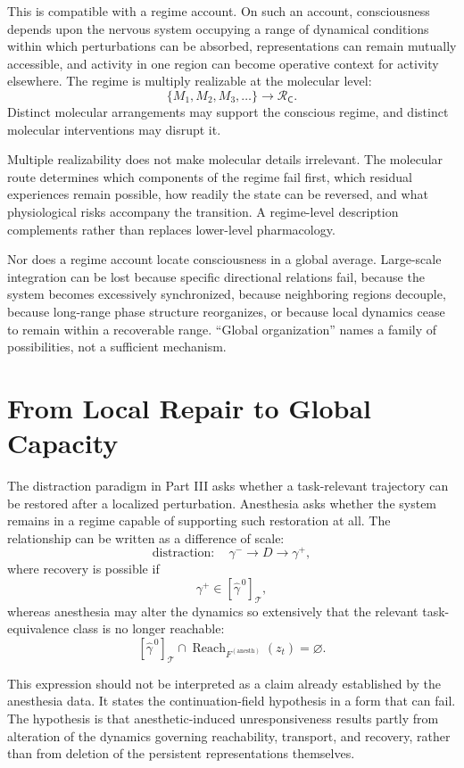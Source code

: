 \documentclass[11pt]{book}
\begin{document}
This is compatible with a regime account. On such an account, consciousness depends upon the nervous system occupying a range of dynamical conditions within which perturbations can be absorbed, representations can remain mutually accessible, and activity in one region can become operative context for activity elsewhere. The regime is multiply realizable at the molecular level:
\[
\{M_1,M_2,M_3,\ldots\}
\longrightarrow
\mathcal R_{\mathsf C}.
\]
Distinct molecular arrangements may support the conscious regime, and distinct molecular interventions may disrupt it.

Multiple realizability does not make molecular details irrelevant. The molecular route determines which components of the regime fail first, which residual experiences remain possible, how readily the state can be reversed, and what physiological risks accompany the transition. A regime-level description complements rather than replaces lower-level pharmacology.

Nor does a regime account locate consciousness in a global average. Large-scale integration can be lost because specific directional relations fail, because the system becomes excessively synchronized, because neighboring regions decouple, because long-range phase structure reorganizes, or because local dynamics cease to remain within a recoverable range. ``Global organization'' names a family of possibilities, not a sufficient mechanism.

\section*{From Local Repair to Global Capacity}

The distraction paradigm in Part III asks whether a task-relevant trajectory can be restored after a localized perturbation. Anesthesia asks whether the system remains in a regime capable of supporting such restoration at all. The relationship can be written as a difference of scale:
\[
\text{distraction}:
\quad
\gamma^{-}
\longrightarrow
D
\longrightarrow
\gamma^{+},
\]
where recovery is possible if
\[
\gamma^{+}
\in
[\widehat{\gamma}^{\,0}]_{\mathcal T},
\]
whereas anesthesia may alter the dynamics so extensively that the relevant task-equivalence class is no longer reachable:
\[
[\widehat{\gamma}^{\,0}]_{\mathcal T}
\cap
\operatorname{Reach}_{F^{(\mathrm{anesth})}}
(z_t)
=
\varnothing.
\]

This expression should not be interpreted as a claim already established by the anesthesia data. It states the continuation-field hypothesis in a form that can fail. The hypothesis is that anesthetic-induced unresponsiveness results partly from alteration of the dynamics governing reachability, transport, and recovery, rather than from deletion of the persistent representations themselves.
\end{document}
